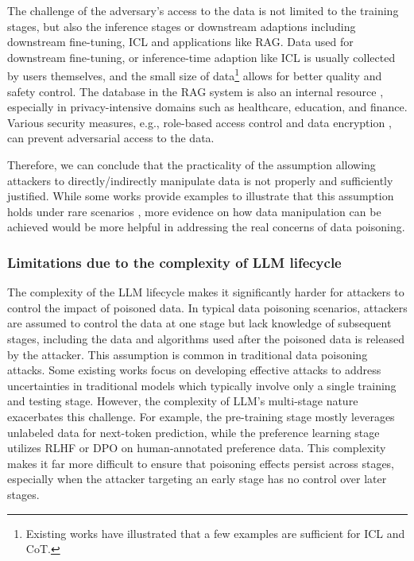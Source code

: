 The challenge of the adversary's access to the data is not limited to the training stages, but also the inference stages or downstream adaptions including downstream fine-tuning,  ICL and applications like RAG. 
Data used for downstream fine-tuning, or inference-time adaption like ICL is usually collected by users themselves, and the small size of data\footnote{Existing works have illustrated that a few examples are sufficient for ICL and CoT.} \citep{min2022rethinking} allows for better quality and safety control. The database in the RAG system is also an internal resource \citep{li2024enhancing}, especially in privacy-intensive domains such as healthcare, education, and finance. Various security measures, e.g., role-based access control \citep{sandhu1998role,versatile2025rbac} and data encryption \citep{ramachandra2022efficient}, can prevent adversarial access to the data. 

Therefore, we can conclude that the practicality of the assumption allowing attackers to directly/indirectly manipulate data is not properly and sufficiently justified. While some works provide examples to illustrate that this assumption holds under rare scenarios \citep{chen2024agentpoison,xiang2024badchain}, more evidence on how data manipulation can be achieved would be more helpful in addressing the real concerns of data poisoning. 


\subsubsection{Limitations due to the complexity of LLM lifecycle}

The complexity of the LLM lifecycle makes it significantly harder for attackers to control the impact of poisoned data. In typical data poisoning scenarios, attackers are assumed to control the data at one stage but lack knowledge of subsequent stages, including the data and algorithms used after the poisoned data is released by the attacker. This assumption is common in traditional data poisoning attacks. Some existing works  \citep{he2023sharpness, huang2020metapoison} focus on developing effective attacks to address uncertainties in traditional models which typically involve only a single training and testing stage. However, the complexity of LLM's multi-stage nature exacerbates this challenge. 
For example, the pre-training stage mostly leverages unlabeled data for next-token prediction, while the preference learning stage utilizes RLHF or DPO on human-annotated preference data. This complexity makes it far more difficult to ensure that poisoning effects persist across stages, especially when the attacker targeting an early stage has no control over later stages.

